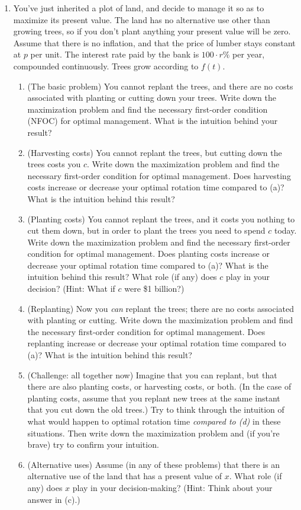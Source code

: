 \begin{enumerate}

\item You've just inherited a plot of land, and decide to manage it so as to maximize its present value. The land has no alternative use other than growing trees, so if you don't plant anything your present value will be zero. Assume that there is no inflation, and that the price of lumber stays constant at $p$ per unit. The interest rate paid by the bank is $100\cdot r\%$ per year, compounded continuously. Trees grow according to $f(t)$.
    \begin{enumerate}
    \item (The basic problem) You cannot replant the trees, and there are no costs associated with planting or cutting down your trees. Write down the maximization problem and find the necessary first-order condition (NFOC) for optimal management. What is the intuition behind your result?
    \item (Harvesting costs) You cannot replant the trees, but cutting down the trees costs you $c$. Write down the maximization problem and find the necessary first-order condition for optimal management. Does harvesting costs increase or decrease your optimal rotation time compared to (a)? What is the intuition behind this result?
    \item (Planting costs) You cannot replant the trees, and it costs you nothing to cut them down, but in order to plant the trees you need to spend $c$ today. Write down the maximization problem and find the necessary first-order condition for optimal management. Does planting costs increase or decrease your optimal rotation time compared to (a)? What is the intuition behind this result? What role (if any) does $c$ play in your decision? (Hint: What if $c$ were \$1 billion?)
    \item (Replanting) Now you \emph{can} replant the trees; there are no costs associated with planting or cutting. Write down the maximization problem and find the necessary first-order condition for optimal management. Does replanting increase or decrease your optimal rotation time compared to (a)? What is the intuition behind this result?
    \item (Challenge: all together now) Imagine that you can replant, but that there are also planting costs, or harvesting costs, or both. (In the case of planting costs, assume that you replant new trees at the same instant that you cut down the old trees.) Try to think through the intuition of what would happen to optimal rotation time \emph{compared to (d)} in these situations. Then write down the maximization problem and (if you're brave) try to confirm your intuition.
    \item (Alternative uses) Assume (in any of these problems) that there is an alternative use of the land that has a present value of $x$. What role (if any) does $x$ play in your decision-making? (Hint: Think about your answer in (c).)
    \end{enumerate}



%
\end{enumerate}


%
%
